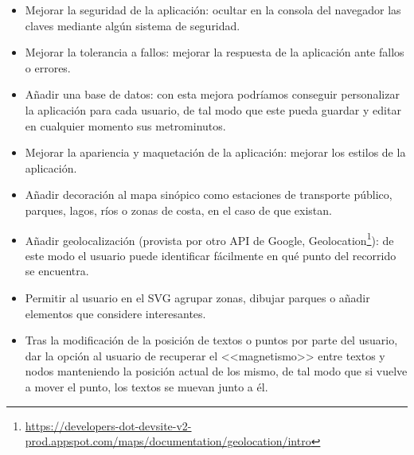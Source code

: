 \begin{itemize}
	\item Mejorar la seguridad de la aplicación: ocultar en la consola del navegador las claves mediante algún sistema de seguridad.
	\item Mejorar la tolerancia a fallos: mejorar la respuesta de la aplicación ante fallos o errores.
	\item Añadir una base de datos: con esta mejora podríamos conseguir personalizar la aplicación para cada usuario, de tal modo que este pueda guardar y editar en cualquier momento sus metrominutos.
	\item Mejorar la apariencia y maquetación de la aplicación: mejorar los estilos de la aplicación.
	\item Añadir decoración al mapa sinópico como estaciones de transporte público, parques, lagos, ríos o zonas de costa, en el caso de que existan.
	\item Añadir geolocalización (provista por otro API de Google, Geolocation\footnote{\url{https://developers-dot-devsite-v2-prod.appspot.com/maps/documentation/geolocation/intro}}): de este modo el usuario puede identificar fácilmente en qué punto del recorrido se encuentra.
	\item Permitir al usuario en el SVG agrupar zonas, dibujar parques o añadir elementos que considere interesantes.
	\item Tras la modificación de la posición de textos o puntos por parte del usuario, dar la opción al usuario de recuperar el <<magnetismo>> entre textos y nodos manteniendo la posición actual de los mismo, de tal modo que si vuelve a mover el punto, los textos se muevan junto a él.
\end{itemize}
